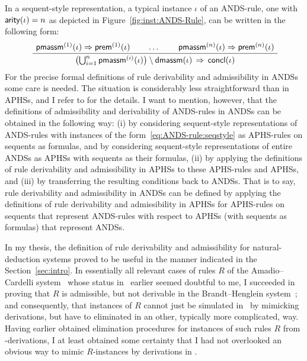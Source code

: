 \documentclass[envcountsame,runningheads]{llncs}
\newcommand{\funap}[2]{#1(#2)}
\newcommand{\APHS}{A\hspace*{-0.3pt}P\hspace*{-0.6pt}H\hspace*{-0.4pt}S}
\newcommand{\ANDS}{ANDS}
\newcommand{\arule}{R}
\newcommand{\ainst}{\iota}
\newcommand{\sprem}{{\sf prem}}
\newcommand{\sconcl}{{\sf concl}}
\newcommand{\concl}{\funap{\sconcl}}
\newcommand{\sarity}{{\sf arity}}
\newcommand{\arity}{\funap{\sarity}}
\newcommand{\spremi}[1]{{\sprem^{(#1)}}}
\newcommand{\premi}[1]{\funap{\spremi{#1}}}
\newcommand{\sdmassm}{{\sf dmassm}}
\newcommand{\dmassm}{\funap{\sdmassm}}
\newcommand{\spmassm}{{\sf pmassm}}
\newcommand{\spmassmi}[1]{{\spmassm^{(#1)}}}
\newcommand{\pmassmi}[1]{\funap{\spmassmi{#1}}}
\begin{document}
In a sequent-style representation, a typical instance $\ainst$ 
of an \ANDS-rule, one with $\arity{\ainst} = n$
as depicted in Figure~\ref{fig:inst:ANDS-Rule},
can be written in the following form:
\begin{equation}
  \label{eq:ANDS-rule:seqstyle}
\mbox{
   \AxiomC{$ \pmassmi{1}{\ainst} \Rightarrow \premi{1}{\ainst} $}
   \AxiomC{\ldots}
   \AxiomC{$ \pmassmi{n}{\ainst} \Rightarrow \premi{n}{\ainst} $}
   \TrinaryInfC{$
     \bigl( \bigcup_{i=1}^n \pmassmi{i}{\ainst} \bigr) 
       \setminus \dmassm{\ainst}
         \,\Rightarrow\, \concl{\ainst}
                $}
   \DisplayProof
        }
\end{equation}
For the precise formal
definitions of rule derivability and admissibility in \ANDS{s}
some care is needed. The situation is considerably less straightforward 
than in \APHS{s}, and I refer to \cite{grab:2005} for the details.
I want to mention, however, that the definitions of admissibility and
derivability of \ANDS-rules in \ANDS{s} can be obtained in the 
following way:
(i) by considering sequent-style representations of \ANDS-rules
    with instances of the form~\eqref{eq:ANDS-rule:seqstyle} as \APHS-rules
    on sequents as formulas,
    and by considering sequent-style representations of entire \ANDS{s}
    as \APHS{s} with sequents as their formulas,
(ii) by applying 
     the definitions of rule derivability and admissibility in \APHS{s}
     to these \APHS-rules and \APHS{s},
and 
(iii) by transferring the resulting conditions back to \ANDS{s}. 
That is to say, rule derivability and admissibility in \ANDS{s}
can be defined by applying the definitions
of rule derivability and admissibility  in \APHS{s} 
for \APHS-rules on sequents that represent \ANDS-rules
with respect to \APHS{s} (with sequents as formulas)
that represent \ANDS{s}.

In my thesis, the definition of rule derivability and admissibility
for natural-deduction systems proved to be useful in the manner
indicated in the Section~\ref{sec:intro}.
In essentially all relevant cases of rules $\arule$ of the
Amadio--Cardelli system \ACeq\ whose status
in \BHeq\ earlier seemed doubtful to me,
I succeeded in proving that $\arule$ is admissible, but not derivable
in the Brandt--Henglein system~\BHeq; and consequently, that
instances of $\arule$ cannot just be simulated in \BHeq\ 
by mimicking derivations, but have to eliminated in an other,
typically more complicated, way.
Having earlier obtained  elimination procedures for instances
of such rules $R$ from \BHeq-derivations,
I at least obtained some certainty that I had not overlooked an
obvious way to mimic $\arule$-instances by derivations in \BHeq. 
\end{document}
